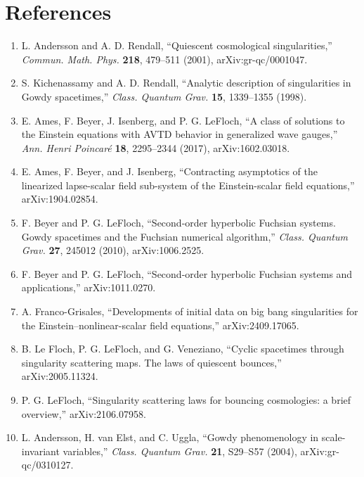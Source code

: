 \documentclass{iopjournal}
\begin{document}
\section*{References}
\begin{enumerate}
\item L. Andersson and A. D. Rendall, “Quiescent cosmological singularities,”
\emph{Commun. Math. Phys.} \textbf{218}, 479--511 (2001), arXiv:gr-qc/0001047.

\item S. Kichenassamy and A. D. Rendall, “Analytic description of singularities
in Gowdy spacetimes,” \emph{Class. Quantum Grav.} \textbf{15}, 1339--1355 (1998).

\item E. Ames, F. Beyer, J. Isenberg, and P. G. LeFloch, “A class of solutions to
the Einstein equations with AVTD behavior in generalized wave gauges,” \emph{Ann. Henri Poincaré} \textbf{18}, 2295--2344 (2017), arXiv:1602.03018.

\item E. Ames, F. Beyer, and J. Isenberg, “Contracting asymptotics of the
linearized lapse-scalar field sub-system of the Einstein-scalar field equations,” arXiv:1904.02854.

\item F. Beyer and P. G. LeFloch, “Second-order hyperbolic Fuchsian systems.
Gowdy spacetimes and the Fuchsian numerical algorithm,” \emph{Class. Quantum Grav.} \textbf{27}, 245012 (2010), arXiv:1006.2525.

\item F. Beyer and P. G. LeFloch, “Second-order hyperbolic Fuchsian systems and
applications,” arXiv:1011.0270.

\item A. Franco-Grisales, “Developments of initial data on big bang singularities
for the Einstein--nonlinear-scalar field equations,” arXiv:2409.17065.

\item B. Le Floch, P. G. LeFloch, and G. Veneziano, “Cyclic spacetimes through
singularity scattering maps. The laws of quiescent bounces,” arXiv:2005.11324.

\item P. G. LeFloch, “Singularity scattering laws for bouncing cosmologies: a
brief overview,” arXiv:2106.07958.

\item L. Andersson, H. van Elst, and C. Uggla, “Gowdy phenomenology in
scale-invariant variables,” \emph{Class. Quantum Grav.} \textbf{21}, S29--S57 (2004), arXiv:gr-qc/0310127.


\end{enumerate}
\end{document}
